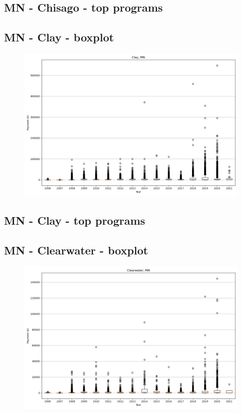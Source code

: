 \subsection*{MN - Chisago - top programs}

\newpage
\subsection*{MN - Clay - boxplot}
\begin{figure}[h]
\centering
\includegraphics[width=7in]{../output/boxplots/counties/Clay-MN_boxplot.png}
\end{figure}


\subsection*{MN - Clay - top programs}

\newpage
\subsection*{MN - Clearwater - boxplot}
\begin{figure}[h]
\centering
\includegraphics[width=7in]{../output/boxplots/counties/Clearwater-MN_boxplot.png}
\end{figure}


